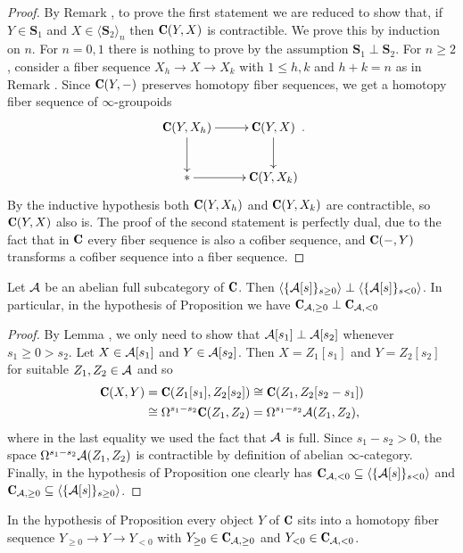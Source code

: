 \documentclass[a4paper,12pt]{amsart}
\begin{document}
\begin{proof}
By Remark , to prove the first statement we are reduced to show that, if $Y\in \mathbf{S}_1$ and $X\in \langle\mathbf{S}_2\rangle_n$ then $\C(Y,X)$ is contractible. We prove this by induction on $n$. For $n=0,1$ there is nothing to prove by the assumption $\mathbf{S}_1\perp \mathbf{S}_2$. For $n\geq 2$, consider a fiber sequence $X_h\to X\to X_k$ with $1\leq h,k$ and $h+k=n$ as in Remark . Since $\C(Y,-)$ preserves homotopy fiber sequences, we get a homotopy fiber sequence of $\infty$-groupoids
\[
\xymatrix{
\C(Y,X_h)\ar[r]\ar[d]& \C(Y,X)\ar[d]\\
{*}\ar[r] &\C(Y,X_k)
}.
\]
By the inductive hypothesis both $\C(Y,X_h)$ and $\C(Y,X_k)$ are contractible, so $\C(Y,X)$ also is. The proof of the second statement is perfectly dual, due to the fact that in $\C$ every fiber sequence is also a cofiber sequence, and $\C(-,Y)$ transforms a cofiber sequence into a fiber sequence.
\end{proof}
\begin{lemma}\label{uno}
Let $\mathcal{A}$ be an abelian full subcategory of $\C$. Then $\langle \{\mathcal{A}[s]\}_{s\geq 0}\rangle\perp \langle \{\mathcal{A}[s]\}_{s<0}\rangle$. In particular, in the hypothesis of Proposition  we have $\C_{\A,\geq 0}\perp \C_{\A,<0}$
\end{lemma}
\begin{proof}
By Lemma , we only need to show that $\mathcal{A}[s_1]\perp \mathcal{A}[s_2]$ whenever $s_1\geq 0> s_2$. Let $X\in \mathcal{A}[s_1]$ and $Y\in\mathcal{A}[s_2]$. Then $X=Z_1[s_1]$ and $Y=Z_2[s_2]$ for suitable $Z_1,Z_2\in \mathcal{A}$ and so 
\begin{align*}
\C(X,Y)&=\C(Z_1[s_1],Z_2[s_2])\cong  \C(Z_1,Z_2[s_2-s_1])\\
&\cong \Omega^{s_1-s_2}\C(Z_1,Z_2)=\Omega^{s_1-s_2}\A(Z_1,Z_2),
\end{align*}
where in the last equality we used the fact that $\mathcal{A}$ is full. Since $s_1-s_2>0$, the space $\Omega^{s_1-s_2}\mathcal{A}(Z_1,Z_2)$ is contractible by definition of abelian $\infty$-category.
Finally, in the hypothesis of Proposition   one clearly has $\C_{\A,< 0}\subseteq \langle \{\A[s]\}_{s<0}\rangle$ and $\C_{\A,\geq 0}\subseteq \langle \{\A[s]\}_{s\geq 0}\rangle$.
\end{proof}
\begin{lemma}\label{due}
In the hypothesis of Proposition  every object $Y$ of $\C$ sits into a homotopy fiber sequence $Y_{\geq 0}\to Y\to Y_{<0}$ with $Y_{\geq 0}\in \C_{\A,\geq 0}$ and $Y_{< 0}\in \C_{\A,< 0}$.
\end{lemma}
\end{document}
